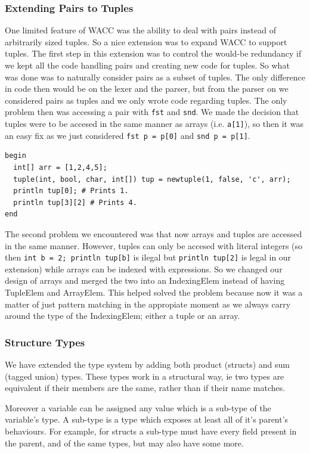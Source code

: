 \documentclass{article}
\begin{document}
\subsubsection{Extending Pairs to Tuples}
One limited feature of WACC was the ability to deal with pairs instead of arbitrarily sized tuples. So a nice extension was to expand WACC to support tuples. The first step in this extension was to control the would-be redundancy if we kept all the code handling pairs and creating new code for tuples. So what was done was to naturally consider pairs as a subset of tuples. The only difference in code then would be on the lexer and the parser, but from the parser on we considered pairs as tuples and we only wrote code regarding tuples. The only problem then was accessing a pair with \texttt{fst} and \texttt{snd}. We made the decision that tuples were to be accesed in the same manner as arrays (i.e. \texttt{a[1]}), so then it  was an easy fix as we just considered \texttt{fst p = p[0]} and \texttt{snd p = p[1]}.

\begin{lstlisting}
begin
  int[] arr = [1,2,4,5];
  tuple(int, bool, char, int[]) tup = newtuple(1, false, 'c', arr);
  println tup[0]; # Prints 1.
  println tup[3][2] # Prints 4.
end
\end{lstlisting}

The second problem we encountered was that now arrays and tuples are accessed in the same manner. However, tuples can only be accesed with literal integers (so
then \texttt{int b = 2; println tup[b]} is ilegal but \texttt{println tup[2]} is legal in our extension) while arrays can be indexed with expressions. So we changed our design of arrays and merged the two into an IndexingElem instead of having TupleElem and ArrayElem. This helped solved the problem because now it was a matter of just pattern matching in the appropiate moment as we always carry around the type of the IndexingElem; either a tuple or an array.


\subsubsection{Structure Types}
We have extended the type system by adding both product (structs) and sum (tagged union) types.
These types work in a structural way, ie two types are equivalent if their members are the same,
rather than if their name matches.

Moreover a variable can be assigned any value which is a sub-type of the variable's type. A
sub-type is a type which exposes at least all of it's parent's behaviours. For example, for structs
a sub-type must have every field present in the parent, and of the same types, but may also have some more.
\end{document}
